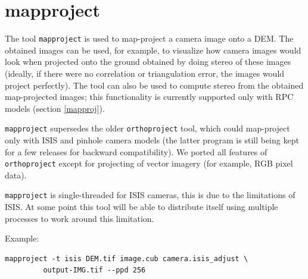 \section{mapproject}
\label{mapproject}

The tool \texttt{mapproject} is used to map-project a camera image onto
a DEM. The obtained images can be used, for example, to visualize how
camera images would look when projected onto the ground obtained by
doing stereo of these images (ideally, if there were no correlation or
triangulation error, the images would project perfectly). The tool can
also be used to compute stereo from the obtained map-projected images;
this functionality is currently supported only with RPC models (section
\ref{mapproj}).

\texttt{mapproject} supersedes the older
\texttt{orthoproject} tool, which could map-project only with ISIS and
pinhole camera models (the latter program is still being kept for a few
releases for backward compatibility). We ported all features of
\texttt{orthoproject} except for projecting of vector imagery (for
example, RGB pixel data).

\texttt{mapproject} is single-threaded for ISIS cameras, this is due to
the limitations of ISIS. At some point this tool will be able to
distribute itself using multiple processes to work around this limitation.


Example:
\begin{verbatim}
mapproject -t isis DEM.tif image.cub camera.isis_adjust \
         output-IMG.tif --ppd 256
\end{verbatim}

